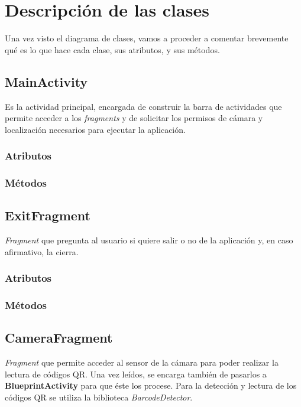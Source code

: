 \documentclass[11pt,a4paper]{article}
\begin{document}
\section{Descripción de las clases}

Una vez visto el diagrama de clases, vamos a proceder a comentar brevemente qué es lo que hace cada clase, sus
atributos, y sus métodos.

\subsection{\textbf{MainActivity}}
\label{sec:main}

Es la actividad principal, encargada de construir la barra de actividades que permite acceder
a los \textit{fragments} y de solicitar los permisos de cámara y localización necesarios para ejecutar
la aplicación.

\subsubsection{Atributos}

\subsubsection{Métodos}


\subsection{\textbf{ExitFragment}}
\label{sec:exit}

\textit{Fragment} que pregunta al usuario si quiere salir o no de la aplicación y, en caso afirmativo, la cierra.

\subsubsection{Atributos}

\subsubsection{Métodos}

\subsection{\textbf{CameraFragment}}
\label{sec:camera}

\textit{Fragment} que permite acceder al sensor de la cámara para poder realizar la lectura
de códigos QR. Una vez leídos, se encarga también de pasarlos a \textbf{BlueprintActivity} para que éste los procese.
Para la detección y lectura de los códigos QR se utiliza la biblioteca \textit{BarcodeDetector}.
\end{document}
